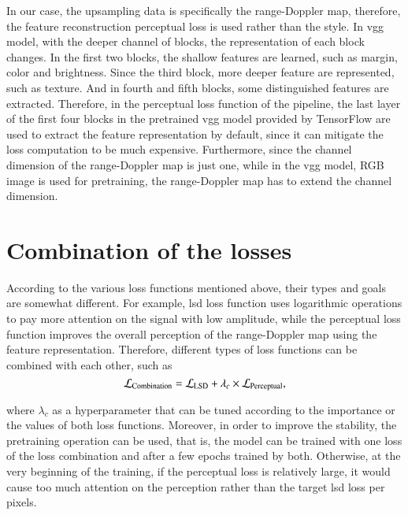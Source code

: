 In our case, the upsampling data is specifically the range-Doppler map, therefore, the feature reconstruction perceptual loss is used rather than the style. In \gls{vgg} model, with the deeper channel of blocks, the representation of each block changes. In the first two blocks, the shallow features are learned, such as margin, color and brightness. Since the third block, more deeper feature are represented, such as texture. And in fourth and fifth blocks, some distinguished features are extracted. Therefore, in the perceptual loss function of the pipeline, the last layer of the first four blocks in the pretrained \gls{vgg} model provided by TensorFlow are used to extract the feature representation by default, since it can mitigate the loss computation to be much expensive. Furthermore, since the channel dimension of the range-Doppler map is just one, while in the \gls{vgg} model, RGB image is used for pretraining, the range-Doppler map has to extend the channel dimension.

\section{Combination of the losses} \label{combination of the losses}
According to the various loss functions mentioned above, their types and goals are somewhat different. For example, \gls{lsd} loss function uses logarithmic operations to pay more attention on the signal with low amplitude, while the perceptual loss function improves the overall perception of the range-Doppler map using the feature representation. Therefore, different types of loss functions can be combined with each other, such as
\begin{equation}
    \centering
    \mathcal{L}_{\text{Combination}} = \mathcal{L}_{\text{LSD}} + \lambda_c \times \mathcal{L}_{\text{Perceptual}},
    \label{loss combination equation}
\end{equation}

where $\lambda_c$ as a hyperparameter that can be tuned according to the importance or the values of both loss functions. Moreover, in order to improve the stability, the pretraining operation can be used, that is, the model can be trained with one loss of the loss combination and after a few epochs trained by both. Otherwise, at the very beginning of the training, if the perceptual loss is relatively large, it would cause too much attention on the perception rather than the target \gls{lsd} loss per pixels.

